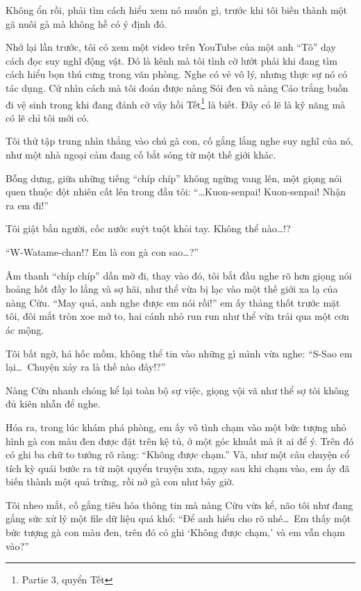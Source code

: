 \documentclass[../main.tex]{subfiles}
\begin{document}
Không ổn rồi, phải tìm cách hiểu xem nó muốn gì, trước khi tôi biến thành một gã nuôi gà mà không hề có ý định đó.

Nhớ lại lần trước, tôi có xem một video trên YouTube của một anh ``Tô'' dạy cách đọc suy nghĩ động vật. Đó là kênh mà tôi tình cờ lướt phải khi đang tìm cách hiểu bọn thú cưng trong văn phòng. Nghe có vẻ vô lý, nhưng thực sự nó có tác dụng. Cứ nhìn cách mà tôi đoán được nàng Sói đen và nàng Cáo trắng buồn đi vệ sinh trong khi đang đánh cờ vây hồi Tết\footnote{{\sen Partie 3}, quyển Tết} là biết. Đây có lẽ là kỹ năng mà có lẽ chỉ tôi mới có.

Tôi thử tập trung nhìn thẳng vào chú gà con, cố gắng lắng nghe suy nghĩ của nó, như một nhà ngoại cảm đang cố bắt sóng từ một thế giới khác.

Bỗng dưng, giữa những tiếng ``chíp chíp'' không ngừng vang lên, một giọng nói quen thuộc đột nhiên cất lên trong đầu tôi: ``\dots  Kuon-senpai! Kuon-senpai! Nhận ra em đi!''

Tôi giật bắn người, cốc nước suýt tuột khỏi tay. Không thể nào\dots!?

``W-Watame-chan!? Em là con gà con sao\dots?''

Âm thanh ``chíp chíp'' dần mờ đi, thay vào đó, tôi bắt đầu nghe rõ hơn giọng nói hoảng hốt đầy lo lắng và sợ hãi, như thể vừa bị lạc vào một thế giới xa lạ của nàng Cừu. ``May quá, anh nghe được em nói rồi!'' em ấy thảng thốt trước mặt tôi, đôi mắt tròn xoe mở to, hai cánh nhỏ run run như thể vừa trải qua một cơn ác mộng.

Tôi bất ngờ, há hốc mồm, không thể tin vào những gì mình vừa nghe: ``S-Sao em lại\dots\ Chuyện xảy ra là thế nào đây!?''

Nàng Cừu nhanh chóng kể lại toàn bộ sự việc, giọng vội vã như thể sợ tôi không đủ kiên nhẫn để nghe.

Hóa ra, trong lúc khám phá phòng, em ấy vô tình chạm vào một bức tượng nhỏ hình gà con màu đen được đặt trên kệ tủ, ở một góc khuất mà ít ai để ý. Trên đó có ghi ba chữ to tướng rõ ràng: ``Không được chạm.'' Và, như một câu chuyện cổ tích kỳ quái bước ra từ một quyển truyện xưa, ngay sau khi chạm vào, em ấy đã biến thành một quả trứng, rồi nở gà con như bây giờ.


Tôi nheo mắt, cố gắng tiêu hóa thông tin mà nàng Cừu vừa kể, não tôi như đang gắng sức xử lý một file dữ liệu quá khổ:
``Để anh hiểu cho rõ nhé\dots\ Em thấy một bức tượng gà con màu đen, trên đó có ghi `Không được chạm,' và em vẫn chạm vào?''
\end{document}
